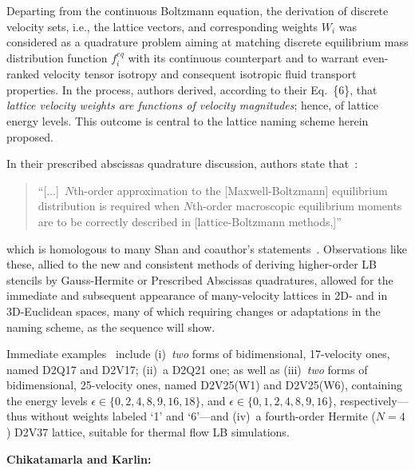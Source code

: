     Departing from the continuous Boltzmann equation, the derivation of discrete velocity sets, i.e., the lattice  vectors,  and
    corresponding weights $W_i$ was considered as a quadrature problem aiming at matching discrete equilibrium mass distribution
    function $f^{eq}_i$ with its continuous counterpart and to warrant  even-ranked  velocity  tensor  isotropy  and  consequent
    isotropic fluid transport properties. In the process, authors derived, according  to  their  Eq.~\{6\},  that  \emph{lattice
    velocity weights are functions of velocity magnitudes}; hence, of lattice energy levels. This  outcome  is  central  to  the
    lattice naming scheme herein proposed.

    In their prescribed abscissas quadrature discussion, authors state that~\cite[p.~6]{2006-PhilippiPC+SurmasR-PhysRevE}:
    \begin{quote}
        \swshape
        ``[...]~$N$th-order approximation to the [Maxwell-Boltzmann]  equilibrium  distribution  is  required  when  $N$th-order
        macroscopic equilibrium moments are to be correctly described in [lattice-Boltzmann methods,]''
    \end{quote}
    \noindent which is homologous to many Shan and coauthor's statements~\cite{2006-ShanX+ChenH-JFluidMech}. Observations  like
    these, allied to the new and consistent methods  of  deriving  higher-order  LB  stencils  by  Gauss-Hermite  or  Prescribed
    Abscissas quadratures, allowed for the immediate  and  subsequent  appearance  of  many-velocity  lattices  in  2D-  and  in
    3D-Euclidean spaces, many of which requiring changes or adaptations in the naming scheme, as the sequence will show.

    Immediate examples~\cite{2006-PhilippiPC+SurmasR-PhysRevE} include (i)~\emph{two} forms of bidimensional, 17-velocity  ones,
    named D2Q17 and D2V17; (ii)~a D2Q21 one; as well  as  (iii)~\emph{two}  forms  of  bidimensional,  25-velocity  ones,  named
    D2V25(W1) and D2V25(W6), containing the energy levels $\epsilon \in \{0, 2, 4, 8, 9, 16, 18\}$, and $\epsilon \in \{0, 1, 2,
    4, 8, 9, 16\}$, respectively---thus without weights labeled `1' and `6'---and  (iv)~a  fourth-order  Hermite  ($N=4$)  D2V37
    lattice, suitable for thermal flow LB simulations.

    \vspace{2.0mm}\noindent\textbf{Chikatamarla and Karlin:}\vspace{1.0mm}


